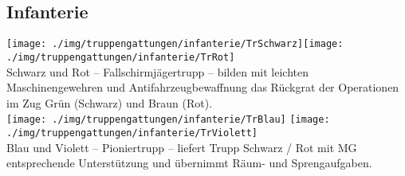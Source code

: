 \subsection{Infanterie}
\texttt{[image: ./img/truppengattungen/infanterie/TrSchwarz]}\quad\texttt{[image: ./img/truppengattungen/infanterie/TrRot]}\\
Schwarz und Rot -- Fallschirmjägertrupp -- bilden mit leichten Maschinengewehren und Antifahrzeugbewaffnung das Rückgrat der Operationen im Zug Grün (Schwarz) und Braun (Rot).\\

\texttt{[image: ./img/truppengattungen/infanterie/TrBlau]} \quad \texttt{[image: ./img/truppengattungen/infanterie/TrViolett]}\\
Blau und Violett -- Pioniertrupp -- liefert Trupp Schwarz / Rot mit MG entsprechende Unterstützung und übernimmt Räum- und Sprengaufgaben.